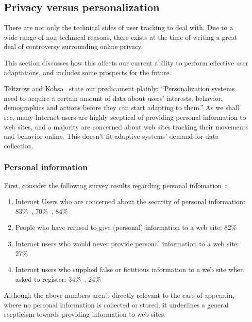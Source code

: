   \subsection{Privacy versus personalization}
  \label{survey:privacy_vs_personalization}

    There are not only the technical sides of user tracking to deal with. Due to a wide range of non-technical reasons, there exists at the time of writing a great deal of controversy surrounding online privacy.

    This section discusses how this affects our current ability to perform effective user adaptations, and includes some prospects for the future.

    Teltzrow and Kobsa~\cite{Teltzrow2004} state our predicament plainly: ``Personalization systems need to acquire a certain amount of data about users' interests, behavior, demographics and actions before they can start adapting to them.'' As we shall see, many Internet users are highly sceptical of providing personal information to web sites, and a majority are concerned about web sites tracking their movements and behavior online. This doesn't fit adaptive systems' demand for data collection.

    \subsubsection{Personal information}

      First, consider the following survey results regarding personal infomation~\cite{Teltzrow2004}:

      \begin{enumerate}
        \item Internet Users who are concerned about the security of personal information: 83\%~\cite{CyberDialogue2001}, 70\%~\cite{Behrens2001}, 84\%~\cite{Fox2000}
        \item People who have refused to give (personal) information to a web site: 82\%~\cite{Culnan2001}
        \item Internet users who would never provide personal information to a web site: 27\%~\cite{Fox2000}
        \item Internet users who supplied false or fictitious information to a web site when asked to register: 34\%~\cite{Culnan2001}, 24\%~\cite{Fox2000}
      \end{enumerate}

      Although the above numbers aren't directly relevant to the case of appear.in, where no personal information is collected or stored, it underlines a general scepticism towards providing information to web sites.

